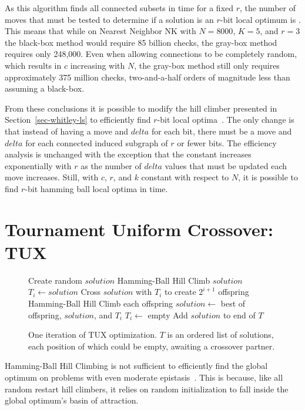 As this algorithm finds all connected subsets in  time for a fixed $r$, the number of moves
that must be tested to determine if a solution is an $r$-bit local optimum is . This means that
while on Nearest Neighbor NK with $N=8000$, $K=5$, and $r=3$ the black-box method would require 85 billion
checks, the gray-box method requires only 248,000. Even when allowing connections to be completely random,
which results in $c$ increasing with $N$, the gray-box method still only requires approximately 375 million checks,
two-and-a-half orders of magnitude less than assuming a black-box.

From these conclusions it is possible to modify the hill climber presented in Section~\ref{sec-whitley-ls} to
efficiently find $r$-bit local optima~\cite{chicano:2014:ball}. The only change is that instead of having a move
and $delta$ for each bit, there must be a move and $delta$ for each connected induced subgraph of $r$ or fewer bits.
The efficiency analysis is unchanged with the exception that the constant increases exponentially with $r$ as
the number of $delta$ values that must be updated each move increases. Still, with $c$, $r$, and $k$ constant
with respect to $N$, it is possible to find $r$-bit hamming ball local optima in  time.

\section{Tournament Uniform Crossover: TUX}
\label{sec-tux}
\begin{figure}
  \begin{algorithmic}[1]
    \State Create random $solution$
    \State Hamming-Ball Hill Climb $solution$
        \State $T_i \leftarrow solution$
        \State \Return
      \EndIf
      \State Cross $solution$ with $T_i$ to create $2^{i+1}$ offspring
      \State Hamming-Ball Hill Climb each offspring
      \State $solution \leftarrow$ best of offspring, $solution$, and $T_i$
      \State $T_i \leftarrow$ empty
    \EndFor
    \State Add $solution$ to end of $T$
  \EndProcedure
\end{algorithmic}
  \caption{One iteration of TUX optimization. $T$ is an
           ordered list of solutions, each position of which could be empty,
           awaiting a crossover partner.}
  \label{fig-TUX}
\end{figure}

Hamming-Ball Hill Climbing is not sufficient to efficiently find the global optimum
on problems with even moderate epistasis~\cite{chicano:2014:ball}. This is because,
like all random restart hill climbers, it relies on random initialization to fall
inside the global optimum's basin of attraction.

